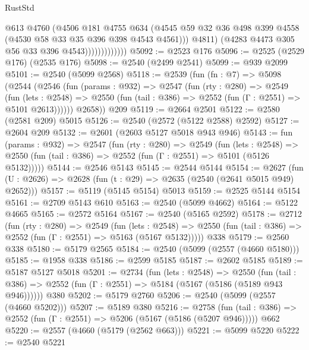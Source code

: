 \begin{lexlean}{RustStd}
\begin{coremodule}
                              @613
                              @4760
                              (@4506
                                @181
                                @4755
                                @634
                                (@4545
                                  @59
                                  @32
                                  @36
                                  @498
                                  @399
                                  @4558
                                  (@4530 @58 @33 @35 @396 @398 @4543 @4561)))
                              @4811)
                            (@4283 @4473 @305 @56 @33 @396 @4543)))))))))))))
@5092 := @2523 @176
@5096 := @2525 (@2529 @176) (@2535 @176)
@5098 := @2540 (@2499 @2541)
@5099 := @939 @2099
@5101 := @2540 (@5099 @2568)
@5118 := @2539
    (fun (fn : @7) =>
    @5098
      (@2544
        (@2546
          (fun (params : @932) =>
          @2547
            (fun (rty : @280) =>
            @2549
              (fun (lets : @2548) =>
              @2550 (fun (tail : @386) => @2552 (fun (Γ : @2551) => @5101 @2613))))))
        @2658))
    @209
@5119 := @2664 @2501
@5122 := @2580 (@2581 @209) @5015
@5126 := @2540 (@2572 (@5122 @2588) @2592)
@5127 := @2604 @209
@5132 := @2601 (@2603 @5127 @5018 @943 @946)
@5143 := fun (params : @932) =>
  @2547
    (fun (rty : @280) =>
    @2549
      (fun (lets : @2548) =>
      @2550 (fun (tail : @386) => @2552 (fun (Γ : @2551) => @5101 (@5126 @5132)))))
@5144 := @2546 @5143
@5145 := @2544 @5144
@5154 := @2627 (fun (U : @2626) => @2628 (fun (t : @29) => @2635 (@2540 (@2641 @5015 @949) @2652)))
@5157 := @5119 (@5145 @5154) @5013
@5159 := @2525 @5144 @5154
@5161 := @2709 @5143 @610
@5163 := @2540 (@5099 @4662)
@5164 := @5122 @4665
@5165 := @2572 @5164
@5167 := @2540 (@5165 @2592)
@5178 := @2712
    (fun (rty : @280) =>
    @2549
      (fun (lets : @2548) =>
      @2550 (fun (tail : @386) => @2552 (fun (Γ : @2551) => @5163 (@5167 @5132)))))
    @338
@5179 := @2560 @338
@5180 := @5179 @2565
@5184 := @2540 (@5099 (@2557 (@4660 @5180)))
@5185 := @1958 @338
@5186 := @2599 @5185
@5187 := @2602 @5185
@5189 := @5187 @5127 @5018
@5201 := @2734
    (fun (lets : @2548) =>
    @2550 (fun (tail : @386) => @2552 (fun (Γ : @2551) => @5184 (@5167 (@5186 (@5189 @943 @946))))))
    @380
@5202 := @5179 @2760
@5206 := @2540 (@5099 (@2557 (@4660 @5202)))
@5207 := @5189 @380
@5216 := @2758
    (fun (tail : @386) => @2552 (fun (Γ : @2551) => @5206 (@5167 (@5186 (@5207 @946)))))
    @662
@5220 := @2557 (@4660 (@5179 (@2562 @663)))
@5221 := @5099 @5220
@5222 := @2540 @5221

\end{coremodule}
\end{lexlean}
